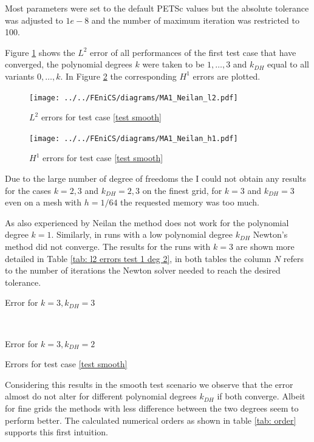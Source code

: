 Most parameters were set to the default PETSc values %
but the absolute tolerance was adjusted to $1e-8$ and the number of maximum iteration was restricted to 100. 

Figure \ref{fig: l2 errors test 1} shows the $L^2$ error of all performances of the first test case that have converged, the polynomial degrees $k$ were taken to be $1,\dots,3$ and $k_{DH}$ equal to all variants $0, \dots, k$. In Figure \ref{fig: h1 errors test 1} the corresponding $H^1$ errors are plotted.
\begin{figure}[H]
\centering
	\texttt{[image: ../../FEniCS/diagrams/MA1\_Neilan\_l2.pdf]}
	\caption{$L^2$ errors for test case \ref{test smooth}}
	\label{fig: l2 errors test 1}
\end{figure}
\begin{figure}[H]
\centering
	\texttt{[image: ../../FEniCS/diagrams/MA1\_Neilan\_h1.pdf]}
	\caption{$H^1$ errors for test case \ref{test smooth}}
	\label{fig: h1 errors test 1}
\end{figure}

Due to the large number of degree of freedoms the I could not obtain any results for the cases $k=2,3$ and $k_{DH}=2,3$ on the finest grid, for $k=3$ and $k_{DH}=3$ even on a mesh with $h=1/64$ the requested memory was too much.

As also experienced by Neilan the method does not work for the polynomial degree $k=1$. Similarly, in runs with a low polynomial degree $k_{DH}$ Newton's method did not converge. 
The results for the runs with $k=3$ are shown more detailed in Table \ref{tab: l2 errors test 1 deg 2}, in both tables the column $N$ refers to the number of iterations the Newton solver needed to reach the desired tolerance. 
\begin{table}[H]
	\begin{subtable}[b]{0.45\textwidth}
		\centering
		\pgfplotstabletypeset[columns={iterations, l2error, h1error,N},
				    every row 0 column 0/.style={set content=init},
		]\MAOnedegThreeThree
    	\caption{Error for $k=3, k_{DH}=3$}
   \end{subtable}
   ~
	\begin{subtable}[b]{0.45\textwidth}
		\centering
		\pgfplotstabletypeset[columns={iterations, l2error, h1error,N},
				    every row 0 column 0/.style={set content=init},
		]\MAOnedegThreeTwo
 	\caption{Error for $k=3, k_{DH}=2$}
	\end{subtable}
	\caption{Errors for test case \ref{test smooth}}
	\label{tab: l2 errors test 1 deg 2}
\end{table}
Considering this results in the smooth test scenario we observe that the error almost do not alter for different polynomial degrees $k_{DH}$ if both converge. Albeit for fine grids the methods with less difference between the two degrees seem to perform better. The calculated numerical orders as shown in table \ref{tab: order} supports this first intuition.

